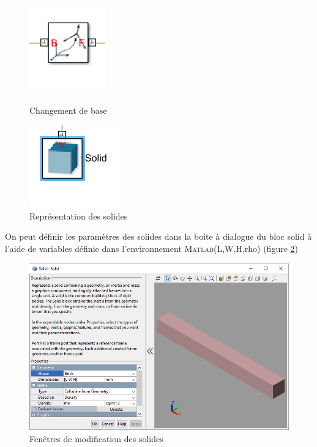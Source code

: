 \documentclass[12pt,a4paper]{article}
\begin{document}
\begin{figure}[h!]
\centering
\begin{minipage}[c]{0.4\linewidth}
\centering
\includegraphics[scale=0.7]{changement.png}
\caption{Changement de base}
\label{changement_base}
\end{minipage} \hfill
\begin{minipage}[c]{0.4\linewidth}
\centering
\includegraphics[scale=0.75]{solid.png}
\caption{Représentation des solides}
\label{solide}
\end{minipage} 
\end{figure}

On peut définir les paramètres des solides dans la boite à dialogue du bloc solid à l'aide de variables définie dans l'environnement \textsc{Matlab}(L,W,H,rho) (figure \ref{géométrie})

\begin{figure}[h!]
\centering
\includegraphics[width=0.8\linewidth]{geometrie.png}
\caption{Fenêtres de modification des solides}
\label{géométrie}
\end{figure}
\end{document}
